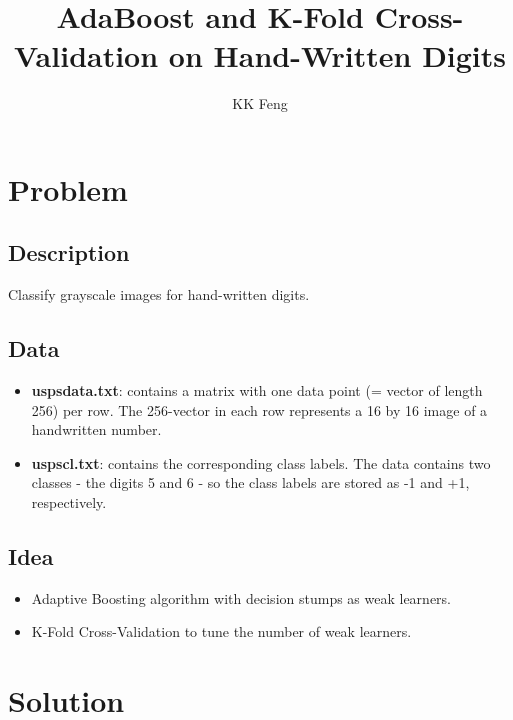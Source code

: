 \documentclass[letterpaper,hidelinks]{article}
\author{KK Feng}
\title{AdaBoost and K-Fold Cross-Validation on Hand-Written Digits}
\date{}
\numberwithin{equation}{section}
\begin{document}
\maketitle
\section{Problem}
\subsection{Description}
Classify grayscale images for hand-written digits.
\subsection{Data}
\begin{itemize}
\item \textbf{uspsdata.txt}: contains a matrix with one data point (= vector of length 256) per row. The 256-vector in each row represents a 16 by 16 image of a handwritten number.
\item \textbf{uspscl.txt}: contains the corresponding class labels.
The data contains two classes - the digits 5 and 6 - so the class labels are stored as -1 and +1, respectively.
\end{itemize}
\subsection{Idea}
\begin{itemize}
\item Adaptive Boosting algorithm with decision stumps as weak learners.
\item K-Fold Cross-Validation to tune the number of weak learners.
\end{itemize}

\section{Solution}
\end{document}
